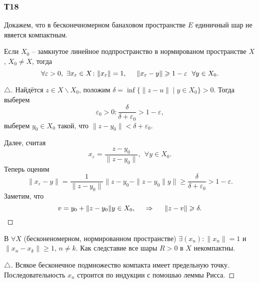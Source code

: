 \subsubsection*{Т18}

Докажем, что в бесконечномерном банаховом пространстве $E$ единичный шар не явяется компактным. 


\begin{to_lem}
    Если $X_0$ -- замкнутое линейное подпространство в нормированом пространстве $X$, $X_0 \neq X$, тогда
    \begin{equation*}
        \forall \varepsilon > 0, \ \exists x_\varepsilon \in X \colon \|x_\varepsilon\| = 1,
        \hspace{5 mm} 
        \|x_\varepsilon - y\| \geq 1 - \varepsilon \ \ \forall y \in X_0.
    \end{equation*}
\end{to_lem}

\begin{proof}[$\triangle$]
    Найдётся $z \in X \backslash X_0$, положим $\delta = \inf\{
        \|z - u\| \mid y \in X_0
    \} > 0$.
    Тогда выберем
    \begin{equation*}
        \varepsilon_0 > 0 \colon  \frac{\delta}{\delta+\varepsilon_0} > 1 - \varepsilon,
    \end{equation*}
    выберем $y_0 \in X_0$ такой, что $\|z - y_0\| < \delta + \varepsilon_0$.

    Далее, считая
    \begin{equation*}
        x_\varepsilon = \frac{z-y_0}{\|z-y_0\|}, \  \ \forall y \in X_0.
    \end{equation*}
    Теперь оценим
    \begin{equation*}
        \|x_\varepsilon - y\| = \frac{1}{\|z-y_0\|} \|z-y_0-\|z-y_0\|y\| \geq \frac{\delta}{\delta+\varepsilon_0} > 1 - \varepsilon.
    \end{equation*}
    Заметим, что
    \begin{equation*}
        v = y_0 + \|z-y_0\| y \in X_0,
        \hspace{0.5cm} \Rightarrow \hspace{0.5cm}
        \|z-v\| \geq \delta.
    \end{equation*}
\end{proof}



\begin{to_con}
    В $\forall X$  (бесконеномерном, нормированном пространстве) $\exists (x_n) \colon  \|x_n\| = 1$ и
    $\|x_n - x_k\| \geq 1$, $n \neq k$.
    Как следставие все шары $R > 0$ в $X$ некомпактны. 
\end{to_con}

\begin{proof}[$\triangle$]

Всякое бесконечное подмножество компакта имеет предельную точку. 
Последовательность $x_n$ строится по индукции с помошью леммы Рисса. 

\end{proof}


